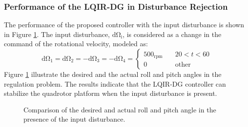 \documentclass[preprint,12pt,authoryear]{elsarticle}
\begin{document}
\subsubsection{Performance of the LQIR-DG in Disturbance Rejection}\label{sec:disturbance}
\noindent The performance of the proposed controller with the input disturbance is shown in Figure \ref{fig:disturbance}. The input disturbance, $\mathrm{d\Omega_i}$, is considered as a change in the command of the rotational velocity, modeled as: %
\begin{equation}
	\mathrm{d\Omega_1} = \mathrm{d\Omega_2} = -\mathrm{d\Omega_3} = -\mathrm{d\Omega_4} = \begin{cases}
		500_{\mathrm{rpm}} \quad &20<t<60\\
		0 \quad &\mathrm{other}
	\end{cases}
\end{equation}
Figure \ref{fig:disturbance} illustrate the desired and the actual roll and pitch angles in the regulation problem. The results indicate that the LQIR-DG controller can stabilize the quadrotor platform when the input disturbance is present.
\begin{figure}[H]
	\centering
	\caption{Comparison of the desired and actual roll and pitch angle in the presence of the input disturbance.}
	\label{fig:disturbance}
\end{figure}
\end{document}
